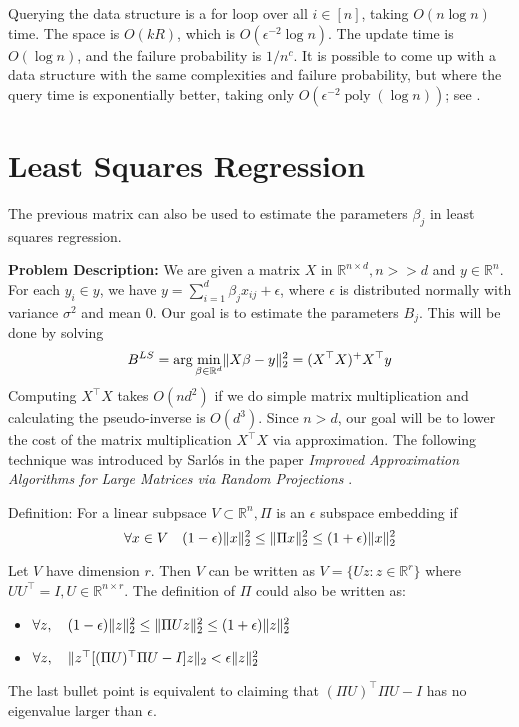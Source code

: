 \documentclass[11pt]{article}
\DeclarePairedDelimiter \norm {\|} {\|}
\begin{document}
Querying the data structure is a for loop over all $i\in[n]$, taking $O(n\log n)$ time. The space is $O(kR)$, which is $O(\epsilon^{-2}\log n)$. The update time is $O(\log n)$, and the failure probability is $1/n^c$. It is possible to come up with a data structure with the same complexities and failure probability, but where the query time is exponentially better, taking only $O(\epsilon^{-2}\mathop{poly}(\log n))$; see \cite{LarsenNNT16}.

\section{Least Squares Regression}
The previous matrix can also be used to estimate the parameters $\beta_{j}$ in least squares regression. 

\textbf{Problem Description:} We are given a matrix $X$ in $\mathbb{R}^{n \times d}, n >> d$ and $y \in \mathbb{R}^{n}$. For each $y_{i} \in y$, we have $y = \sum_{i = 1}^{d} \beta_{j}x_{ij} + \epsilon$, where $\epsilon$ is distributed normally with variance $\sigma^{2}$ and mean $0$. Our goal is to estimate the parameters $B_{j}$. This will be done by solving $$B^{LS} = \arg \min_{\beta \in \mathbb{R}^{d}} \norm{X\beta - y}_{2}^{2} = (X^{\top}X)^{+}X^{\top}y$$ Computing $X^{\top}X$ takes $O(nd^{2})$ if we do simple matrix multiplication and calculating the pseudo-inverse is $O(d^{3})$.  Since $n > d$, our goal will be to lower the cost of the matrix multiplication $X^{\top}X$ via approximation. The following technique was introduced by Sarl\'{o}s in the paper \textit{Improved Approximation Algorithms for Large Matrices via Random Projections} \cite{Sarlos2006}. 

Definition: For a linear subpsace $V \subset \mathbb{R}^{n}, \Pi$ is an $\epsilon$ subspace embedding if $$\forall x \in V \quad (1 - \epsilon) \norm{x}^{2}_{2} \leq \norm{\Pi x}_{2}^{2} \leq (1 + \epsilon) \norm{x}_{2}^{2}$$

Let $V$ have dimension $r$. Then $V$ can be written as $V=\{Uz : z \in \mathbb{R}^{r}\}$ where $UU^\top = I, U \in \mathbb{R}^{n \times r}$. The definition of $\Pi$ could also be written as:
\begin{itemize}
\item $\forall z, \quad  (1 - \epsilon) \norm{z}^{2}_{2} \leq \norm{\Pi U z}_{2}^{2} \leq (1 + \epsilon) \norm{z}^{2}_{2}$
\item $\forall z, \quad \norm{z^{\top} [(\Pi U)^{\top} \Pi U - I] z}_{2} < \epsilon \norm{z}_{2}^{2}$
\end{itemize}
The last bullet point is equivalent to claiming that $(\Pi U)^{\top} \Pi U - I$ has no eigenvalue larger than $\epsilon$. 
\end{document}

